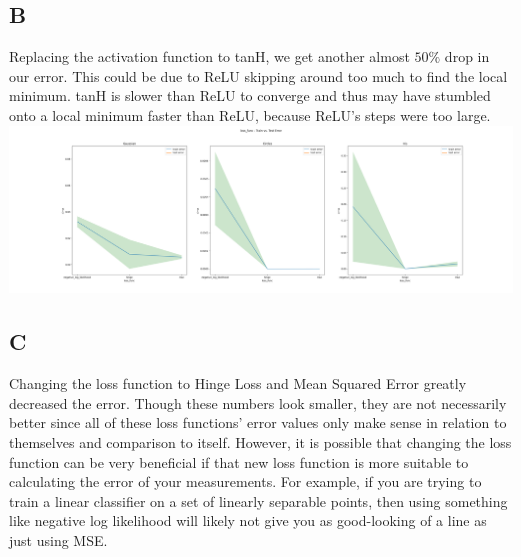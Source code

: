 \documentclass{article}
\begin{document}
\subsection{B}
Replacing the activation function to tanH, we get another almost $50\%$ drop in our error. This could be due to ReLU skipping around too much to find the local minimum. tanH is slower than ReLU to converge and thus may have stumbled onto a local minimum faster than ReLU, because ReLU's steps were too large.
\includegraphics*[width=16cm]{loss_func}
\subsection{C}

Changing the loss function to Hinge Loss and Mean Squared Error greatly decreased the error. Though these numbers look smaller, they are not necessarily better since all of these loss functions' error values only make sense in relation to themselves and comparison to itself. However, it is possible that changing the loss function can be very beneficial if that new loss function is more suitable to calculating the error of your measurements. For example, if you are trying to train a linear classifier on a set of linearly separable points, then using something like negative log likelihood will likely not give you as good-looking of a line as just using MSE.
\end{document}
